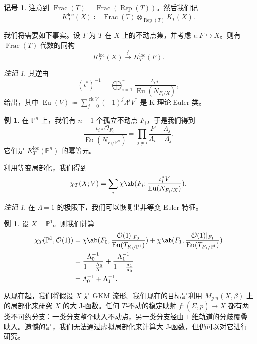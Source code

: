 \documentclass{amsart}
\theoremstyle{definition}
\newtheorem{exm}[thm]{例}
\newtheorem{notn}[thm]{记号}
\theoremstyle{remark}
\newtheorem{rmk}[thm]{注记}
\theoremstyle{plain}
\theoremstyle{definition}
\theoremstyle{remark}
\renewcommand{\P}{\mathbb{P}}
\newcommand{\mc}[1]{\mathcal{#1}}
\newcommand{\mr}[1]{\mathrm{#1}}
\newcommand{\on}[1]{\operatorname{#1}}
\newcommand{\ul}[1]{\underline{#1}}
\newcommand{\1}{\mathbf{1}}
\newcommand{\2}{\mathbf{2}}
\newcommand{\3}{\mathbf{3}}
\newcommand{\loc}{\mr{loc}}
\begin{document}
\begin{notn}
    注意到 \(\on{Frac}(T) = \on{Frac}(\on{Rep}(T))\)。然后我们记
    \[ K_T^{\loc}(X) \coloneqq \on{Frac}(T) \otimes_{\on{Rep}(T)} K_T(X). \]
\end{notn}

我们将需要如下事实。设 \(F\) 为 \(T\) 在 \(X\) 上的不动点集，并考虑 \(\iota \colon F \hookrightarrow X\)。则有 \(\on{Frac}(T)\)-代数的同构
\[ K_T^{\loc}(X) \xrightarrow{\iota^*} K_T^{\loc}(F). \]

\begin{rmk}
    其逆由
    \[ (\iota^*)^{-1} = \bigoplus_{i=1}^r \frac{\iota_{i*}}{\on{Eu}(N_{F_i/X})}, \]
    给出，其中 \(\on{Eu}(V) \coloneqq \sum_{j = 0}^{\on{rk} V} (-1)^j \Lambda^j V^*\) 是 K-理论 Euler 类。
\end{rmk}

\begin{exm}
    在 \(\P^n\) 上，我们有 \(n+1\) 个孤立不动点 \(F_i\)，于是我们得到
    \[ \frac{\iota_{i*} \mc{O}_{F_i}}{\on{Eu}(N_{F_i/\P^n})} = \prod_{j \neq i} \frac{P - \Lambda_j}{\Lambda_i - \Lambda_j}. \]
    它们是 \(K_T^{\loc}(\P^n)\) 的幂等元。
\end{exm}

利用等变局部化，我们得到
\[ \chi_T(X; V) = \sum_i \chi\ab(F_i; \frac{\iota_i^* V}{\on{Eu}(N_{F_i/X})}). \]

\begin{rmk}
    在 \(\Lambda = 1\) 的极限下，我们可以恢复出非等变 Euler 特征。
\end{rmk}

\begin{exm}
    设 \(X = \P^1\)。则我们计算
    \begin{align*}
        \chi_T(\P^1, \mc{O}(1)) &= \chi\ab(F_0, \frac{\mc{O}(1)|_{F_0}}{\on{Eu}(T_{F_0/\P^1})}) + \chi\ab(F_1, \frac{\mc{O}(1)|_{F_1}}{\on{Eu}(T_{F_1/\P^1})}) \\
        &= \frac{\Lambda_0^{-1}}{1 - \frac{\Lambda_0}{\Lambda_1}} + \frac{\Lambda_1^{-1}}{1 - \frac{\Lambda_1}{\Lambda_0}} \\
        &= \Lambda_0^{-1} + \Lambda_1^{-1}. 
    \end{align*}
\end{exm}

从现在起，我们将假设 \(X\) 是 GKM 流形。我们现在的目标是利用 \(\bar{M}_{g,n}(X, \beta)\) 上的局部化来研究 \(X\) 的大 J-函数。任何 \(T\)-不动的稳定映射 \(f \colon (\Sigma, \ul{p}) \to X\) 都有两类不可约分支：一类分支整个映入不动点，另一类分支经由 \(1\) 维轨道的分歧覆叠映入。遗憾的是，我们无法通过虚拟局部化来计算大 J-函数，但仍可以对它进行研究。
\end{document}
